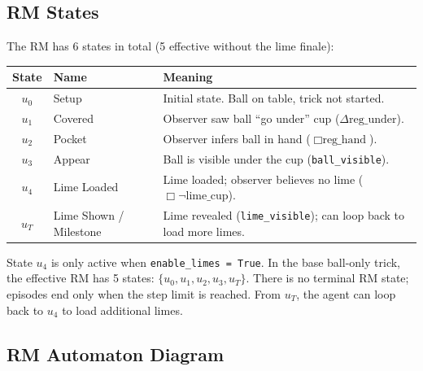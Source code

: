 \documentclass[11pt]{article}
\newcommand{\EBel}[1]{\ensuremath{\Delta #1}} %
\newcommand{\IBel}[1]{\ensuremath{\Box #1}}   %
\begin{document}
\subsection{RM States}

The RM has 6 states in total (5 effective without the lime finale):

\begin{center}
\begin{tabular}{cll}
\toprule
\textbf{State} & \textbf{Name} & \textbf{Meaning} \\
\midrule
$u_0$ & Setup & Initial state. Ball on table, trick not started. \\
$u_1$ & Covered & Observer saw ball ``go under'' cup ($\EBel{\text{reg\_under}}$). \\
$u_2$ & Pocket & Observer infers ball in hand ($\IBel{\text{reg\_hand}}$). \\
$u_3$ & Appear & Ball is visible under the cup (\texttt{ball\_visible}). \\
$u_4$ & Lime Loaded & Lime loaded; observer believes no lime ($\IBel{\neg\text{lime\_cup}}$). \\
$u_T$ & Lime Shown / Milestone & Lime revealed (\texttt{lime\_visible}); can loop back to load more limes. \\
\bottomrule
\end{tabular}
\end{center}

State $u_4$ is only active when \texttt{enable\_limes = True}. In the base ball-only trick, the effective RM has 5 states: $\{u_0, u_1, u_2, u_3, u_T\}$. There is no terminal RM state; episodes end only when the step limit is reached. From $u_T$, the agent can loop back to $u_4$ to load additional limes.

\subsection{RM Automaton Diagram}

\begin{center}
\end{center}
\end{document}
